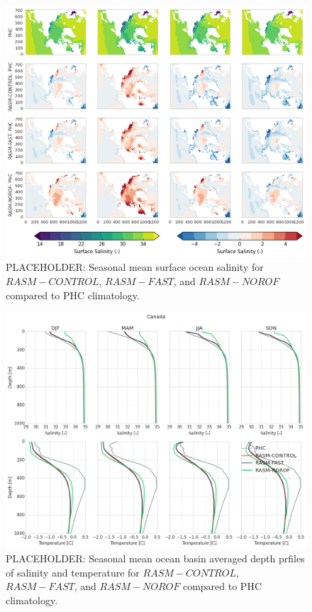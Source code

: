 \documentclass[jgrga, draft]{agutex}
\begin{document}
\clearpage
\begin{figure}
\noindent\includegraphics[width=40pc,natwidth=1]{Figure_7}
\caption{PLACEHOLDER: Seasonal mean surface ocean salinity for $RASM-CONTROL$, $RASM-FAST$, and $RASM-NOROF$ compared to PHC climatology.}
\label{fig:7}
\end{figure}

\clearpage
\begin{figure}
\noindent\includegraphics[width=40pc,natwidth=1]{Figure_8}
\caption{PLACEHOLDER: Seasonal mean ocean basin averaged depth prfiles of salinity and temperature for $RASM-CONTROL$, $RASM-FAST$, and $RASM-NOROF$ compared to PHC climatology.}
\label{fig:8}
\end{figure}
\end{document}
